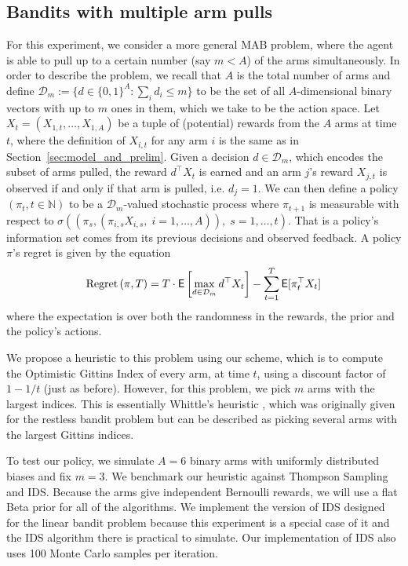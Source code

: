 \subsection{Bandits with multiple arm pulls}
For this experiment, we consider a more general MAB problem, where the agent is able to pull up to a certain number (say $m < A$) of the arms simultaneously. In order to describe the problem, we recall that $A$ is the total number of arms and define  $\mathcal{D}_m := \{d \in \{0,1\}^A : \sum_i d_i \le m\}$ to be the set of all $A$-dimensional binary vectors with up to $m$ ones in them, which we take to be the action space. Let $X_t = (X_{1,t}, \ldots, X_{1,A})$ be a tuple of (potential) rewards from the $A$ arms at time $t$, where the definition of $X_{i,t}$ for any arm $i$ is the same as in Section~\ref{sec:model_and_prelim}. Given a decision $d \in \mathcal D_m$, which encodes the subset of arms pulled, the reward $d^\top X_t$ is earned and an arm $j$'s reward $X_{j,t}$ is observed if and only if that arm is pulled, i.e. $d_{j} = 1$. We can then define a policy $(\pi_t, t \in \mathbb{N})$ to be a $\mathcal{D}_m$-valued stochastic process where $\pi_{t+1}$ is measurable with respect to $\sigma\left( (\pi_s, (\pi_{i,s} X_{i,s}, \;i =1,\ldots,A)), \; s=1,\ldots,t\right)$. That is a policy's information set comes from its previous decisions and observed feedback. A policy $\pi$'s regret is given by the equation 
\[
\textnormal{Regret} \left( \pi, T \right) = T \cdot \mathsf{E} \left[ \max_{d \in \mathcal D_m} d^\top  X_t \right] - \sum_{t=1}^T \mathsf{E}[\pi_t^\top X_t ]
\]
where the expectation is over both the randomness in the rewards, the prior and the policy's actions.

We propose a heuristic to this problem using our scheme, which is to compute the Optimistic Gittins Index of every arm, at time $t$, using a discount factor of $1-1/t$ (just as before). However, for this problem, we pick $m$ arms with the largest indices. This is essentially Whittle's heuristic \citep{whittle1988restless}, which was originally given for the restless bandit problem but can be described as picking several arms with the largest Gittins indices.

To test our policy, we simulate $A = 6$ binary arms with uniformly distributed biases and fix $m=3$. 
We benchmark our heuristic against Thompson Sampling and IDS. Because the arms give independent Bernoulli rewards, we will use a flat Beta prior for all of the algorithms. We implement the version of IDS designed for the linear bandit problem because this experiment is a special case of it and the IDS algorithm there is practical to simulate. Our implementation of IDS also uses 100 Monte Carlo samples per iteration.

